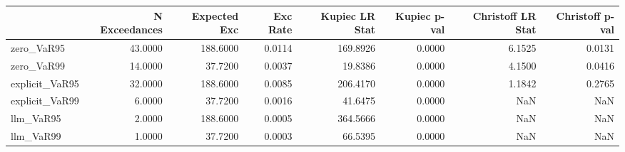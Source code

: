 \begin{tabular}{lrrrrrrr}
\toprule
 & N Exceedances & Expected Exc & Exc Rate & Kupiec LR Stat & Kupiec p-val & Christoff LR Stat & Christoff p-val \\
\midrule
zero_VaR95 & 43.0000 & 188.6000 & 0.0114 & 169.8926 & 0.0000 & 6.1525 & 0.0131 \\
zero_VaR99 & 14.0000 & 37.7200 & 0.0037 & 19.8386 & 0.0000 & 4.1500 & 0.0416 \\
explicit_VaR95 & 32.0000 & 188.6000 & 0.0085 & 206.4170 & 0.0000 & 1.1842 & 0.2765 \\
explicit_VaR99 & 6.0000 & 37.7200 & 0.0016 & 41.6475 & 0.0000 & NaN & NaN \\
llm_VaR95 & 2.0000 & 188.6000 & 0.0005 & 364.5666 & 0.0000 & NaN & NaN \\
llm_VaR99 & 1.0000 & 37.7200 & 0.0003 & 66.5395 & 0.0000 & NaN & NaN \\
\bottomrule
\end{tabular}

